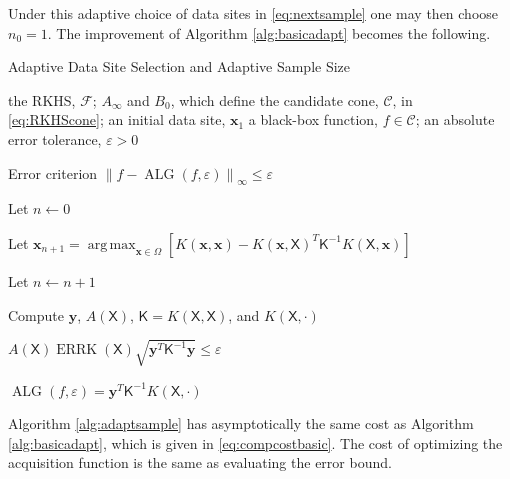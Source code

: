 \documentclass[]{mcom-l}
\theoremstyle{remark}
\DeclareMathOperator*{\argmax}{arg\,max}
\DeclareMathOperator{\ALG}{ALG}
\DeclareMathOperator{\errK}{ERRK}
\newcommand{\mK}{\mathsf{K}}
\newcommand{\mX}{\mathsf{X}}
\newcommand{\bx}{{\boldsymbol{x}}}
\newcommand{\by}{{\boldsymbol{y}}}
\newcommand{\cc}{\mathcal{C}}
\newcommand{\calf}{{\mathcal{F}}}
\newcommand{\norm}[2][{}]{\ensuremath{\left \lVert #2 \right \rVert}_{#1}}
\begin{document}
Under this adaptive choice of data sites in  \eqref{eq:nextsample} one may then choose $n_0 = 1$.  The improvement of Algorithm \ref{alg:basicadapt} becomes the following. 

\begin{algorithm}[H]
	\caption{Adaptive Data Site Selection and Adaptive Sample Size \label{alg:adaptsample}}
	\begin{algorithmic}
		\PARAM the RKHS, $\calf$; $A_\infty$ and $B_0$, which define  the candidate cone, $\cc$, in \eqref{eq:RKHScone}; an initial data site, $\bx_1$
		\INPUT a black-box function, $f \in \cc$; an absolute error tolerance, $\varepsilon>0$
		
		\Ensure Error criterion $\norm[\infty]{f - \ALG(f,\varepsilon)} \le \varepsilon$
		
		\State Let $n \leftarrow 0$
		
		\Repeat
		
		
		\State Let $ \bx_{n+1} = \displaystyle \argmax_{\bx \in \Omega} [K(\bx,\bx) - K(\bx,\mX)^T \mK^{-1} K(\mX,\bx)]$
		
		\EndIf
		
		\State Let $n \leftarrow n + 1$
		
		\State Compute $\by$, $A(\mX)$, $\mK = K(\mX,\mX)$, and $K(\mX,\cdot)$
		
		\Until $A(\mX) \errK(\mX) \sqrt{ \by^T \mK^{-1} \by }  \le \varepsilon$
		
		\RETURN $\ALG(f,\varepsilon) = \by^T \mK^{-1} K(\mX,\cdot)$
		
	\end{algorithmic}
\end{algorithm}

Algorithm \ref{alg:adaptsample} has asymptotically the same cost as Algorithm \ref{alg:basicadapt}, which is given in \eqref{eq:compcostbasic}.  The cost of optimizing the acquisition function is the same as evaluating the error bound.
\end{document}
